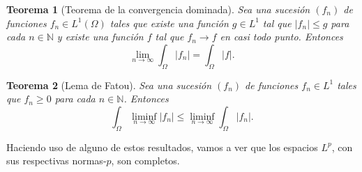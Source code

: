 \documentclass[12pt,a4paper]{book}
\newtheorem{thm}{Teorema}[section]
\theoremstyle{definition} \newtheorem{defn}[thm]{Definición}
\theoremstyle{definition} \newtheorem{ejemplo}[thm]{Ejemplo}
\theoremstyle{definition} \newtheorem{ejercicio}[thm]{Ejercicio}
\theoremstyle{remark} \newtheorem*{obs}{Observación}
\newcommand{\NN}{\mathbb{N}}
\begin{document}
\begin{thm}[Teorema de la convergencia dominada]
  Sea una sucesión $(f_n)$ de funciones $f_n \in L^1(\Omega)$ tales que existe una función $g\in L^1$ tal que $|f_n|\leq g $ para cada $n\in \NN$ y existe una función $f$ tal que $f_n \rightarrow f$ en casi todo punto. Entonces
  \begin{equation*}
    \lim_{n\rightarrow \infty} \int_\Omega |f_n| = \int_\Omega |f|.
  \end{equation*}
\end{thm}

\begin{thm}[Lema de Fatou]
  Sea una sucesión $(f_n)$ de funciones $f_n \in L^1$ tales que $f_n \geq 0$ para cada $n\in \NN$. Entonces 
  \begin{equation*}
  \int_\Omega \liminf_{n\rightarrow \infty} |f_n| \leq  \liminf_{n\rightarrow \infty}\int_\Omega  |f_n|. 
  \end{equation*}
\end{thm}

Haciendo uso de alguno de estos resultados, vamos a ver que los espacios $L^p$, con sus respectivas normas-$p$, son completos.
\end{document}
